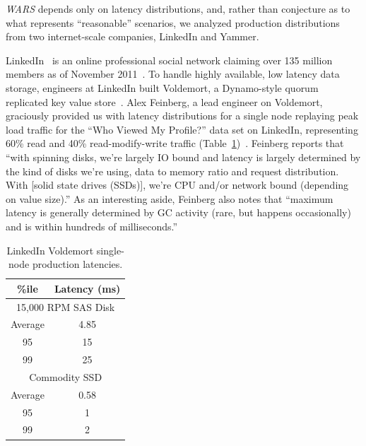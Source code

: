 \documentclass{vldb}
\begin{document}
\textit{WARS} depends only on latency distributions, and, rather than
conjecture as to what represents ``reasonable'' scenarios, we analyzed
production distributions from two internet-scale companies, LinkedIn
and Yammer.

LinkedIn~\cite{linkedin} is an online professional social network
claiming over 135 million members as of November
2011~\cite{linkedinmembers}. To handle highly available, low latency
data storage, engineers at LinkedIn built Voldemort, a Dynamo-style
quorum replicated key value store~\cite{voldemort, voldemortpub}.
Alex Feinberg, a lead engineer on Voldemort, graciously provided us
with latency distributions for a single node replaying peak load
traffic for the ``Who Viewed My Profile?'' data set on LinkedIn,
representing 60\% read and 40\% read-modify-write traffic
(Table~\ref{table:linkedin})~\cite{feinbergpc}.  Feinberg reports that
``with spinning disks, we're largely IO bound and latency is largely
determined by the kind of disks we're using, data to memory ratio and
request distribution.  With [solid state drives (SSDs)], we're CPU
and/or network bound (depending on value size).''  As an interesting
aside, Feinberg also notes that ``maximum latency is generally
determined by GC activity (rare, but happens occasionally) and is
within hundreds of milliseconds.''

\begin{table}
\begin{center}
\begin{tabular}{|c|c|}
\hline
\%ile & Latency (ms) \\
\hline
\multicolumn{2}{|c|}{ 15,000 RPM SAS Disk}\\
\hline
Average & 4.85\\
95 & 15\\
99 & 25\\
\hline
\multicolumn{2}{|c|}{ Commodity SSD }\\
\hline
Average & 0.58 \\
95 & 1\\
99 & 2\\
\hline
\end{tabular}
\caption{LinkedIn Voldemort single-node production latencies.}
\label{table:linkedin}
\end{center}
\end{table}
\end{document}
